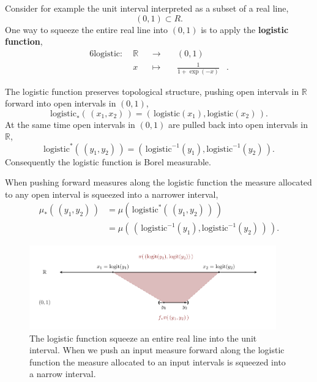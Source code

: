 \documentclass[
  letterpaper,
  DIV=11,
  numbers=noendperiod]{scrartcl}
\begin{document}
Consider for example the unit interval interpreted as a subset of a real
line, \[
(0, 1) \subset R.
\] One way to squeeze the entire real line into \((0, 1)\) is to apply
the \textbf{logistic function}, \begin{alignat*}{6}
\mathrm{logistic} :\; & \mathbb{R} & &\rightarrow& \; & (0, 1) &
\\
& x & &\mapsto& & \frac{1}{1 + \exp(-x)}  &.
\end{alignat*}

The logistic function preserves topological structure, pushing open
intervals in \(\mathbb{R}\) forward into open intervals in \((0, 1)\),
\[
\mathrm{logistic}_{*}( \, (x_{1}, x_{2}) \, )
=
( \, \mathrm{logistic}(x_{1}), \mathrm{logistic}(x_{2}) \, ).
\] At the same time open intervals in \((0, 1)\) are pulled back into
open intervals in \(\mathbb{R}\), \[
\mathrm{logistic}^{*}( \, (y_{1}, y_{2}) \, )
=
( \, \mathrm{logistic}^{-1}(y_{1}), \mathrm{logistic}^{-1}(y_{2}) \, ).
\] Consequently the logistic function is Borel measurable.

When pushing forward measures along the logistic function the measure
allocated to any open interval is squeezed into a narrower interval,
\begin{align*}
\mu_{*}( \, (y_{1}, y_{2}) \, )
&=
\mu( \, \mathrm{logistic}^{*}( \, (y_{1}, y_{2}) \, ) \, )
\\
&=
\mu( \, (\, \mathrm{logistic}^{-1}(y_{1}),
            \mathrm{logistic}^{-1}(y_{2}) \, ) \, ).
\end{align*}

\begin{figure}

{\centering \includegraphics[width=0.95\textwidth,height=\textheight]{figures/line_to_interval/line_to_interval.pdf}

}

\caption{\label{fig-line-to-interval}The logistic function squeeze an
entire real line into the unit interval. When we push an input measure
forward along the logistic function the measure allocated to an input
intervals is squeezed into a narrow interval.}

\end{figure}
\end{document}
